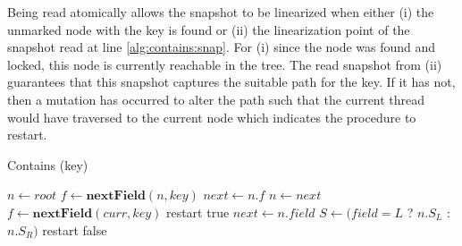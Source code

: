 \documentclass[conference]{IEEEtran}
\theoremstyle{definition}
\theoremstyle{theorem}
\begin{document}
Being read atomically allows the snapshot to be linearized when either (i) the unmarked node with the key is found or (ii) the linearization point of the snapshot read at line \ref{alg:contains:snap}. For (i) since the node was found and locked, this node is currently reachable in the tree. The read snapshot from (ii) guarantees  that this snapshot captures the suitable path for the key. If it has not, then a mutation has occurred to alter the path such that the current thread would have traversed to the current node which indicates the procedure to restart.

\begin{algorithm}[t]
\caption{Contains (key)}
\label{alg:contains}
\begin{algorithmic}[1]
\State $n\gets root$
\State $f \gets \mathbf{nextField}(n, key)$
\State $next \gets n.f$
  \State $n\gets next$
  \State $f \gets \mathbf{nextField}(curr, key)$
  	 \label{alg:contains:lock}
  		\State restart
  	\EndIf
  	\State \Return true
	\EndIf
	\State $next \gets n.field$
\EndWhile
\State $S \gets (field = L$ ? $n.S_L$ : $n.S_R)$
 \label{alg:contains:snap}
\State restart
\EndIf
\State \Return false
\end{algorithmic}
\end{algorithm}
\end{document}
